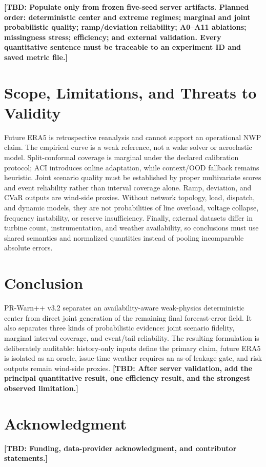 \documentclass[journal]{IEEEtran}
\newcommand{\TODO}[1]{\textbf{[TBD: #1]}}
\begin{document}
\TODO{Populate only from frozen five-seed server artifacts. Planned order: deterministic center and extreme regimes; marginal and joint probabilistic quality; ramp/deviation reliability; A0--A11 ablations; missingness stress; efficiency; and external validation. Every quantitative sentence must be traceable to an experiment ID and saved metric file.}

\section{Scope, Limitations, and Threats to Validity}

Future ERA5 is retrospective reanalysis and cannot support an operational NWP claim. The empirical curve is a weak reference, not a wake solver or aeroelastic model. Split-conformal coverage is marginal under the declared calibration protocol; ACI introduces online adaptation, while context/OOD fallback remains heuristic. Joint scenario quality must be established by proper multivariate scores and event reliability rather than interval coverage alone. Ramp, deviation, and CVaR outputs are wind-side proxies. Without network topology, load, dispatch, and dynamic models, they are not probabilities of line overload, voltage collapse, frequency instability, or reserve insufficiency. Finally, external datasets differ in turbine count, instrumentation, and weather availability, so conclusions must use shared semantics and normalized quantities instead of pooling incomparable absolute errors.

\section{Conclusion}

PR-Warn++ v3.2 separates an availability-aware weak-physics deterministic center from direct joint generation of the remaining final forecast-error field. It also separates three kinds of probabilistic evidence: joint scenario fidelity, marginal interval coverage, and event/tail reliability. The resulting formulation is deliberately auditable: history-only inputs define the primary claim, future ERA5 is isolated as an oracle, issue-time weather requires an as-of leakage gate, and risk outputs remain wind-side proxies. \TODO{After server validation, add the principal quantitative result, one efficiency result, and the strongest observed limitation.}

\section*{Acknowledgment}
\TODO{Funding, data-provider acknowledgment, and contributor statements.}



\end{document}
